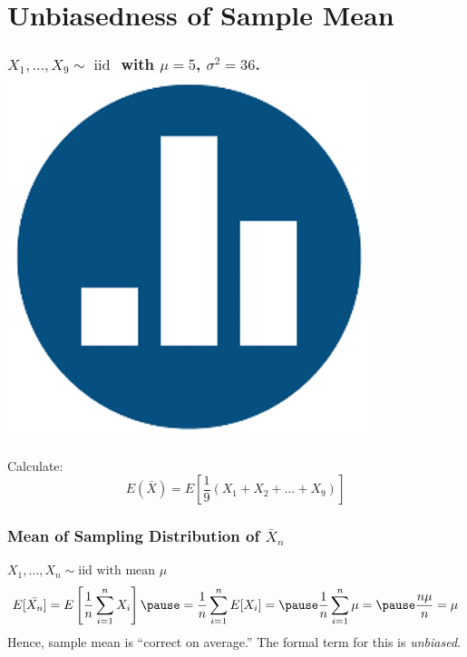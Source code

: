 \section{Unbiasedness of Sample Mean}
\begin{frame}
\frametitle{$X_1,\hdots, X_{9} \sim \mbox{ iid }$ with $\mu=5$, $\sigma^2 =36$. \hfill\includegraphics[scale = 0.05]{./images/clicker}}

\large Calculate:
	 $$E(\bar{X}) = E\left[\frac{1}{9}(X_1 + X_2 + \hdots + X_{9})\right]$$
\end{frame}
\begin{frame}
\frametitle{Mean of Sampling Distribution of $\bar{X}_n$}
\alert{$X_1, \hdots, X_n \sim \mbox{iid with mean }\mu$}
\begin{eqnarray*}
E[\bar{X_n}] = E\left[ \frac{1}{n}\sum_{i=1}^n X_i \right]\pause = \frac{1}{n} \sum_{i=1}^n E[X_i] = \pause\frac{1}{n} \sum_{i=1}^n \mu = \pause \frac{n\mu}{n} = \mu
\end{eqnarray*}
\alert{Hence, sample mean is ``correct on average.'' The formal term for this is \emph{unbiased}.}
\end{frame}

